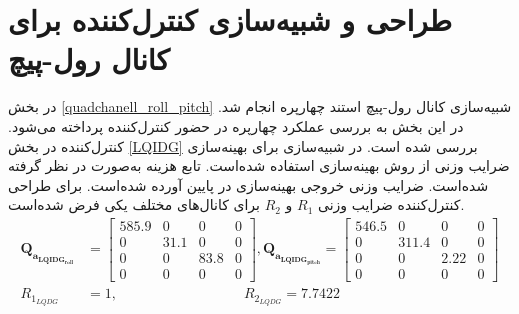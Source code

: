 \section{طراحی و شبیه‌سازی کنترل‌کننده برای کانال رول-پیچ}
\label{roll_pitch_lqidg_section_simulation}
در بخش
\ref{quadchanell_roll_pitch}
شبیه‌سازی کانال رول-پیچ استند چهارپره انجام شد. در این بخش به بررسی عملکرد چهارپره در حضور کنترل‌کننده  پرداخته می‌شود. کنترل‌کننده   در بخش
\ref{LQIDG}
بررسی شده است.
 در شبیه‌سازی برای بهینه‌سازی ضرایب وزنی  از روش بهینه‌سازی
 \cite{Karimi2010}
استفاده شده‌است.
تابع هزینه  به‌صورت
در نظر گرفته شده‌است. ضرایب وزنی خروجی بهینه‌سازی در پایین آورده شده‌است. برای طراحی کنترل‌کننده
ضرایب وزنی
$R_1$
و
$R_2$
برای کانال‌های مختلف یکی فرض شده‌است.
\begin{equation}
	\begin{split}
		\boldsymbol{Q_{a_{LQIDG_{roll}}}} &= \begin{bmatrix}
			585.9 &0& 0& 0\\
			0 &  31.1 & 0 &0 \\
			0 & 0 & 83.8 & 0\\
			0 & 0 & 0 & 0
		\end{bmatrix} ,
	\boldsymbol{Q_{a_{LQIDG_{pitch}}}} = \begin{bmatrix}
		546.5 &0& 0& 0\\
		0 &  311.4 & 0 &0 \\
		0 & 0 & 2.22 & 0\\
		0 & 0 & 0 & 0
		\end{bmatrix}\\
	R_{1_{LQDG}} &=  1,\qquad  \qquad \qquad \qquad \quad R_{2_{LQDG}} =  7.7422
	\end{split}
\end{equation}

